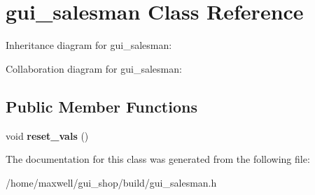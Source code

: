 \hypertarget{classgui__salesman}{}\section{gui\+\_\+salesman Class Reference}
\label{classgui__salesman}


Inheritance diagram for gui\+\_\+salesman\+:


Collaboration diagram for gui\+\_\+salesman\+:
\subsection*{Public Member Functions}
\begin{DoxyCompactItemize}
\item 
void {\bfseries reset\+\_\+vals} ()\hypertarget{classgui__salesman_ade231072dd757c87744fb2b6af670fd6}{}\label{classgui__salesman_ade231072dd757c87744fb2b6af670fd6}

\end{DoxyCompactItemize}


The documentation for this class was generated from the following file\+:\begin{DoxyCompactItemize}
\item 
/home/maxwell/gui\+\_\+shop/build/gui\+\_\+salesman.\+h\end{DoxyCompactItemize}
